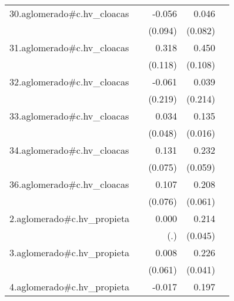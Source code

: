{\begin{longtable}{l*{4}{D{.}{.}{-1}}}
\addlinespace
30.aglomerado#c.hv\_cloacas&                     &      -0.056         &       0.046         &                     \\
            &                     &     (0.094)         &     (0.082)         &                     \\
\addlinespace
31.aglomerado#c.hv\_cloacas&                     &       0.318\sym{**} &       0.450\sym{***}&                     \\
            &                     &     (0.118)         &     (0.108)         &                     \\
\addlinespace
32.aglomerado#c.hv\_cloacas&                     &      -0.061         &       0.039         &                     \\
            &                     &     (0.219)         &     (0.214)         &                     \\
\addlinespace
33.aglomerado#c.hv\_cloacas&                     &       0.034         &       0.135\sym{***}&                     \\
            &                     &     (0.048)         &     (0.016)         &                     \\
\addlinespace
34.aglomerado#c.hv\_cloacas&                     &       0.131         &       0.232\sym{***}&                     \\
            &                     &     (0.075)         &     (0.059)         &                     \\
\addlinespace
36.aglomerado#c.hv\_cloacas&                     &       0.107         &       0.208\sym{***}&                     \\
            &                     &     (0.076)         &     (0.061)         &                     \\
\addlinespace
2.aglomerado#c.hv\_propieta&                     &       0.000         &       0.214\sym{***}&                     \\
            &                     &         (.)         &     (0.045)         &                     \\
\addlinespace
3.aglomerado#c.hv\_propieta&                     &       0.008         &       0.226\sym{***}&                     \\
            &                     &     (0.061)         &     (0.041)         &                     \\
\addlinespace
4.aglomerado#c.hv\_propieta&                     &      -0.017         &       0.197\sym{***}&                     \\

\end{longtable}}
